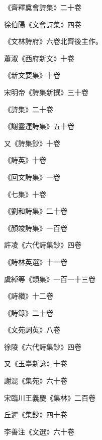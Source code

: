 \begin{pinyinscope}
 《齊釋奠會詩集》二十卷



 徐伯陽《文會詩集》四卷



 《文林詩府》六卷北齊後主作。



 蕭淑《西府新文》十卷



 《新文要集》十卷



 宋明帝《詩集新撰》三十卷



 《詩集》二十卷



 《謝靈運詩集》五十卷



 又《詩集鈔》十卷



 《詩英》十卷



 《回文詩集》一卷



 《七集》十卷



 《劉和詩集》二十卷



 《顏竣詩集》一百卷



 許凌《六代詩集鈔》四卷



 《詩林英選》十一卷



 虞綽等《類集》一百一十三卷



 《詩纘》十二卷



 《詩錄》二十卷



 《文苑詞英》八卷



 徐陵《六代詩集鈔》四卷



 又《玉臺新詠》十卷



 謝混《集苑》六十卷



 宋臨川王義慶《集林》二百卷



 丘遲《集鈔》四十卷



 李善注《文選》六十卷




\end{pinyinscope}
